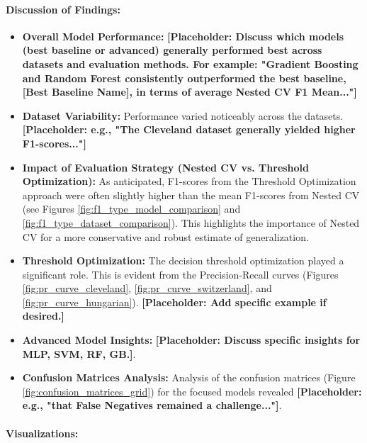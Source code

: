 \documentclass{article}
\begin{document}
\paragraph{Discussion of Findings:}
\begin{itemize}
    \item \textbf{Overall Model Performance:} \textbf{[Placeholder: Discuss which models (best baseline or advanced) generally performed best across datasets and evaluation methods. For example: "Gradient Boosting and Random Forest consistently outperformed the best baseline, [Best Baseline Name], in terms of average Nested CV F1 Mean..."]}
    \item \textbf{Dataset Variability:} Performance varied noticeably across the datasets. \textbf{[Placeholder: e.g., "The Cleveland dataset generally yielded higher F1-scores..."]}
    \item \textbf{Impact of Evaluation Strategy (Nested CV vs. Threshold Optimization):} As anticipated, F1-scores from the Threshold Optimization approach were often slightly higher than the mean F1-scores from Nested CV (see Figures \ref{fig:f1_type_model_comparison} and \ref{fig:f1_type_dataset_comparison}). This highlights the importance of Nested CV for a more conservative and robust estimate of generalization.
    \item \textbf{Threshold Optimization:} The decision threshold optimization played a significant role. This is evident from the Precision-Recall curves (Figures \ref{fig:pr_curve_cleveland}, \ref{fig:pr_curve_switzerland}, and \ref{fig:pr_curve_hungarian}). \textbf{[Placeholder: Add specific example if desired.]}
    \item \textbf{Advanced Model Insights:} \textbf{[Placeholder: Discuss specific insights for MLP, SVM, RF, GB.]}.
    \item \textbf{Confusion Matrices Analysis:} Analysis of the confusion matrices (Figure \ref{fig:confusion_matrices_grid}) for the focused models revealed \textbf{[Placeholder: e.g., "that False Negatives remained a challenge..."]}.
\end{itemize}

\paragraph{Visualizations:}
\end{document}
